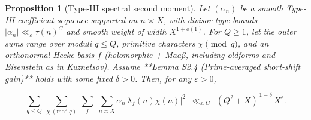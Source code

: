 \documentclass[11pt]{article}
\newtheorem{proposition}[lemma]{Proposition}
\theoremstyle{definition}
\theoremstyle{remark}
\begin{document}
\begin{proposition}[Type-III spectral second moment]\label{prop:typeIII}
Let $(\alpha_n)$ be a smooth Type-III coefficient sequence supported on $n\asymp X$, with divisor-type bounds $|\alpha_n|\ll_\varepsilon \tau(n)^C$ and smooth weight of width $X^{1+o(1)}$. For $Q\ge 1$, let the outer sums range over moduli $q\le Q$, primitive characters $\chi\pmod q$, and an orthonormal Hecke basis $f$ (holomorphic + Maaß, including oldforms and Eisenstein as in Kuznetsov). Assume **Lemma S2.4 (Prime-averaged short-shift gain)** holds with some fixed $\delta>0$. Then, for any $\varepsilon>0$,

$$
\sum_{q\le Q}\ \sum_{\chi\ (\mathrm{mod}\ q)}\ \sum_{f}
\Bigg|\sum_{n\asymp X}\alpha_n\,\lambda_f(n)\chi(n)\Bigg|^2
\ \ \ll_{\varepsilon,C}\ \ (Q^2+X)^{\,1-\delta}\,X^{\varepsilon}.
$$

\end{proposition}
\end{document}
